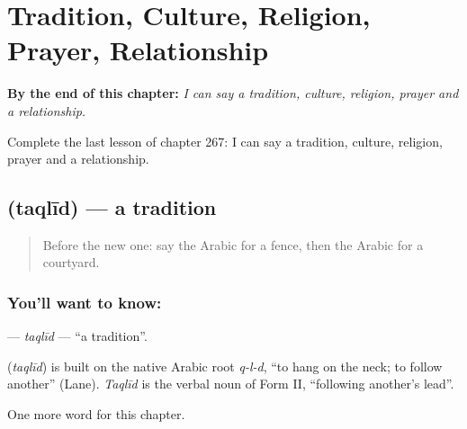 
\chapter{Tradition, Culture, Religion, Prayer, Relationship}
\label{ch:ar-tradition-culture-religion-prayer-relationship}

\begin{chapteropening}
\textbf{By the end of this chapter:} \emph{I can say a tradition, culture, religion, prayer and a relationship.}

Complete the last lesson of chapter 267: I can say a tradition, culture, religion, prayer and a relationship.
\end{chapteropening}

\section[\texorpdfstring{\ar{تقليد} (taqlīd)}{تقليد (taqlīd)}]{ (taqlīd) — a tradition}

\label{lesson:AR-C267-taqlid}



\begin{quote}
Before the new one: say the Arabic for a fence, then the Arabic for a courtyard.
\end{quote}

\subsection*{You'll want to know: }
\textbf{} — \emph{taqlīd} — \textquotedblleft{}a tradition\textquotedblright{}.

\begin{cousinweb}
\textbf{} (\emph{taqlīd}) is built on the native Arabic root \emph{q-l-d}, \textquotedblleft{}to hang on the neck; to follow another\textquotedblright{} (Lane). \emph{Taqlīd} is the verbal noun of Form II, \textquotedblleft{}following another's lead\textquotedblright{}.
\end{cousinweb}

\begin{grammarlens}[title={What you've built}]
One more word for this chapter.
\end{grammarlens}

